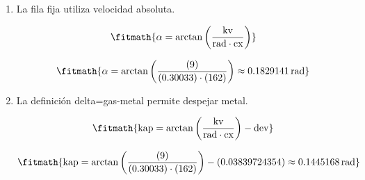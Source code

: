 \begin{enumerate}

\item La fila fija utiliza velocidad absoluta.

\[\fitmath{\alpha=\arctan\left(\frac{\mathrm{kv}}{\mathrm{rad}\cdot \mathrm{cx}}\right)}\]

\[\fitmath{\alpha=\arctan\left(\frac{(9)}{(0.30033)\cdot (162)}\right)\approx 0.1829141\,\mathrm{rad}}\]

\item La definición delta=gas-metal permite despejar metal.

\[\fitmath{\mathrm{kap}=\arctan\left(\frac{\mathrm{kv}}{\mathrm{rad}\cdot \mathrm{cx}}\right)-\mathrm{dev}}\]

\[\fitmath{\mathrm{kap}=\arctan\left(\frac{(9)}{(0.30033)\cdot (162)}\right)-(0.03839724354)\approx 0.1445168\,\mathrm{rad}}\]

\end{enumerate}
